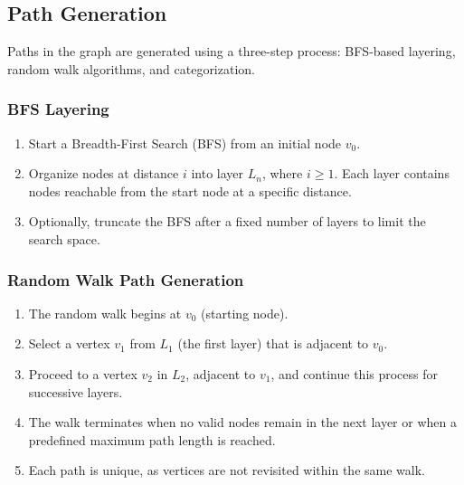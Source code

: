 \documentclass[sigplan,screen]{acmart}
\begin{document}
\subsection{Path Generation}
Paths in the graph are generated using a three-step process: BFS-based layering, random walk algorithms, and categorization.

\subsubsection{BFS Layering}
\begin{enumerate}
    \item Start a Breadth-First Search (BFS) from an initial node $v_0$.
    \item Organize nodes at distance $i$ into layer $L_n$, where $i \geq 1$. Each layer contains nodes reachable from the start node at a specific distance.
    \item Optionally, truncate the BFS after a fixed number of layers to limit the search space.
\end{enumerate}

\subsubsection{Random Walk Path Generation}
\begin{enumerate}
    \item The random walk begins at $v_0$ (starting node).
    \item Select a vertex $v_1$ from $L_1$ (the first layer) that is adjacent to $v_0$.
    \item Proceed to a vertex $v_2$ in $L_2$, adjacent to $v_1$, and continue this process for successive layers.
    \item The walk terminates when no valid nodes remain in the next layer or when a predefined maximum path length is reached.
    \item Each path is unique, as vertices are not revisited within the same walk.
\end{enumerate}
\end{document}
